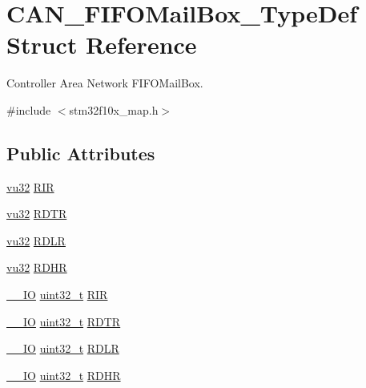 \hypertarget{struct_c_a_n___f_i_f_o_mail_box___type_def}{}\section{C\+A\+N\+\_\+\+F\+I\+F\+O\+Mail\+Box\+\_\+\+Type\+Def Struct Reference}
\label{struct_c_a_n___f_i_f_o_mail_box___type_def}


Controller Area Network F\+I\+F\+O\+Mail\+Box.  




{\ttfamily \#include $<$stm32f10x\+\_\+map.\+h$>$}

\subsection*{Public Attributes}
\begin{DoxyCompactItemize}
\item 
\hyperlink{agilefox_2library_2inc_2stm32f10x__type_8h_a6e2761f0a1011f84ed96b946f2c8a563}{vu32} \hyperlink{struct_c_a_n___f_i_f_o_mail_box___type_def_a6bf9997062a89922d829e5339f891997}{R\+IR}
\item 
\hyperlink{agilefox_2library_2inc_2stm32f10x__type_8h_a6e2761f0a1011f84ed96b946f2c8a563}{vu32} \hyperlink{struct_c_a_n___f_i_f_o_mail_box___type_def_a140124f6a625d35b3d1168f0688056b0}{R\+D\+TR}
\item 
\hyperlink{agilefox_2library_2inc_2stm32f10x__type_8h_a6e2761f0a1011f84ed96b946f2c8a563}{vu32} \hyperlink{struct_c_a_n___f_i_f_o_mail_box___type_def_a03b21e6f0bfa72ca9a7bdd7cd5871284}{R\+D\+LR}
\item 
\hyperlink{agilefox_2library_2inc_2stm32f10x__type_8h_a6e2761f0a1011f84ed96b946f2c8a563}{vu32} \hyperlink{struct_c_a_n___f_i_f_o_mail_box___type_def_a836d61d8cf07eb1eb6ef39f4bffbae16}{R\+D\+HR}
\item 
\hyperlink{group___c_m_s_i_s___c_m3__core__definitions_gaec43007d9998a0a0e01faede4133d6be}{\+\_\+\+\_\+\+IO} \hyperlink{_p_e___types_8h_a33594304e786b158f3fb30289278f5af}{uint32\+\_\+t} \hyperlink{struct_c_a_n___f_i_f_o_mail_box___type_def_a034504d43f7b16b320745a25b3a8f12d}{R\+IR}
\item 
\hyperlink{group___c_m_s_i_s___c_m3__core__definitions_gaec43007d9998a0a0e01faede4133d6be}{\+\_\+\+\_\+\+IO} \hyperlink{_p_e___types_8h_a33594304e786b158f3fb30289278f5af}{uint32\+\_\+t} \hyperlink{struct_c_a_n___f_i_f_o_mail_box___type_def_a49d74ca8b402c2b9596bfcbe4cd051a9}{R\+D\+TR}
\item 
\hyperlink{group___c_m_s_i_s___c_m3__core__definitions_gaec43007d9998a0a0e01faede4133d6be}{\+\_\+\+\_\+\+IO} \hyperlink{_p_e___types_8h_a33594304e786b158f3fb30289278f5af}{uint32\+\_\+t} \hyperlink{struct_c_a_n___f_i_f_o_mail_box___type_def_ac7d62861de29d0b4fcf11fabbdbd76e7}{R\+D\+LR}
\item 
\hyperlink{group___c_m_s_i_s___c_m3__core__definitions_gaec43007d9998a0a0e01faede4133d6be}{\+\_\+\+\_\+\+IO} \hyperlink{_p_e___types_8h_a33594304e786b158f3fb30289278f5af}{uint32\+\_\+t} \hyperlink{struct_c_a_n___f_i_f_o_mail_box___type_def_a95890984bd67845015d40e82fb091c93}{R\+D\+HR}
\end{DoxyCompactItemize}


